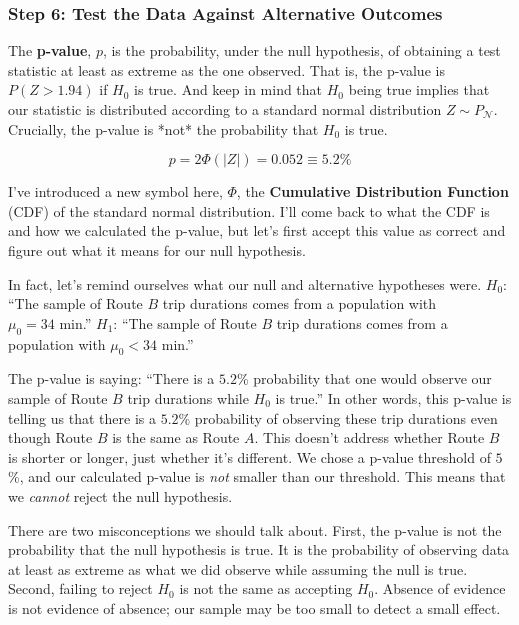 \subsubsection*{Step 6: Test the Data Against Alternative Outcomes}
The \textbf{p-value}, $p$, is the probability, under the null hypothesis, of obtaining a test statistic at least as extreme as the one observed. That is, the p-value is $P(Z>1.94)$ if $H_0$ is true. And keep in mind that $H_0$ being true implies that our statistic is distributed according to a standard normal distribution $Z \sim P_\mathcal{N}$. Crucially, the p-value is *not* the probability that $H_0$ is true.

\begin{equation}
    p = 2 \Phi(| Z |) = 0.052 \equiv 5.2\%
\end{equation}

I've introduced a new symbol here, $\Phi$, the \textbf{Cumulative Distribution Function} (CDF) of the standard normal distribution. I'll come back to what the CDF is and how we calculated the p-value, but let's first accept this value as correct and figure out what it means for our null hypothesis.

In fact, let's remind ourselves what our null and alternative hypotheses were. $H_0$: ``The sample of Route $B$ trip durations comes from a population with $\mu_0 = 34 \text{ min}$.'' $H_1$: ``The sample of Route $B$ trip durations comes from a population with $\mu_0 < 34 \text{ min}$.''

The p-value is saying: ``There is a $5.2$\% probability that one would observe our sample of Route $B$ trip durations while $H_0$ is true.'' In other words, this p-value is telling us that there is a $5.2$\% probability of observing these trip durations even though Route $B$ is the same as Route $A$. This doesn't address whether Route $B$ is shorter or longer, just whether it's different. We chose a p-value threshold of $5$\%, and our calculated p-value is \textit{not} smaller than our threshold. This means that we \textit{cannot} reject the null hypothesis.

There are two misconceptions we should talk about. First, the p-value is not the probability that the null hypothesis is true. It is the probability of observing data at least as extreme as what we did observe while assuming the null is true. Second, failing to reject $H_0$ is not the same as accepting $H_0$. Absence of evidence is not evidence of absence; our sample may be too small to detect a small effect.

